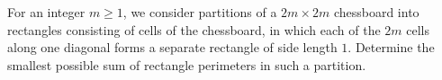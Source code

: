 For an integer $m \geq 1$, we consider partitions of a $2m \times 2m$ chessboard into rectangles consisting of cells of the chessboard, in which each of the $2m$ cells along one diagonal forms a separate rectangle of side length $1$. Determine the smallest possible sum of rectangle perimeters in such a partition.
